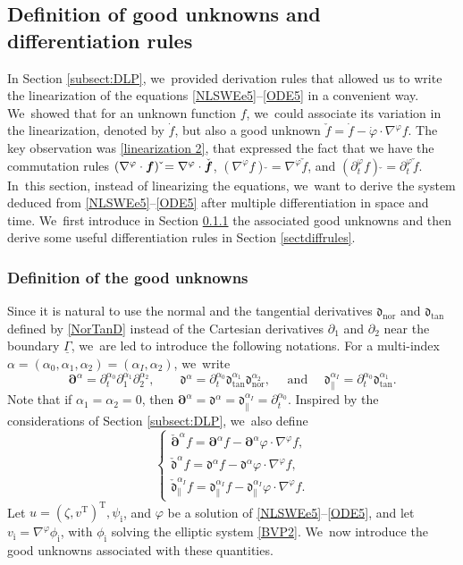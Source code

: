 \documentclass[10pt]{amsart}
\newcommand{\dtan}{{\mathfrak d}_\mathrm{tan}}
\newcommand{\dnor}{{\mathfrak d}_\mathrm{nor}}
\newcommand{\dpar}{{\mathfrak d}_{\parallel}}
\newcommand{\dt}{\partial_t}
\newcommand{\ul}[1]{\underline{#1}}
\newcommand{\itGamma}{\mathit{\Gamma}}
\newcommand{\cpalpha}{\check{\bm{\partial}}^{\alpha} }
\newcommand{\cmfalpha}{\check{\mathfrak{d}}^{\alpha}}
\newcommand{\cmfpalphaI}{\check{\mathfrak{d}}_{\parallel}^{\alpha_I}}
\theoremstyle{definition}
\begin{document}
\subsection{Definition of good unknowns and differentiation rules}\label{subsect:defGU}
In Section \ref{subsect:DLP}, we~provided derivation rules that allowed us to write the linearization of the equations \eqref{NLSWEe5}--\eqref{ODE5} in a convenient way. We~showed that for an unknown function $f$, we~could associate its variation in the linearization, denoted by $\dot{f}$, but also a good unknown $\check{f}=\dot{f}-\dot{\varphi}\cdot\nabla^\varphi f$.
The key observation was \eqref{linearization 2}, that expressed the fact that we have the commutation rules
$(\nabla^\varphi\cdot \mbox{\boldmath$f$})\,\check{} = \nabla^\varphi\cdot \check{\mbox{\boldmath$f$}}$, $(\nabla^\varphi f)\,\check{}
= \nabla^\varphi \check{f}$, and $(\dt^\varphi f)\,\check{} = \dt^\varphi \check{f}$. In~this section, instead of linearizing the equations, we~want to derive the system deduced from \eqref{NLSWEe5}--\eqref{ODE5} after multiple differentiation in space and time. We~first introduce in Section \ref{sectdefGU} the associated good unknowns and then derive some useful differentiation rules in Section \ref{sectdiffrules}.

\subsubsection{Definition of the good unknowns}\label{sectdefGU}
Since it is natural to use the normal and the tangential derivatives $\dnor$ and $\dtan$ defined by \eqref{NorTanD}
instead of the Cartesian derivatives $\partial_1$ and $\partial_2$ near the boundary $\ul{\itGamma}$, we~are led to introduce the following notations.
For a multi-index $\alpha=(\alpha_0,\alpha_1,\alpha_2)=(\alpha_I,\alpha_2)$, we~write
\[
\bm{\partial}^\alpha=\dt^{\alpha_0}\partial_1^{\alpha_1}\partial_2^{\alpha_2}, \qquad
\mathfrak{d}^\alpha=\dt^{\alpha_0}\dtan^{\alpha_1}\dnor^{\alpha_2},
\quad\mbox{ and } \quad
\dpar^{\alpha_I}=\dt^{\alpha_0}\dtan^{\alpha_1}.
\]
Note that if $\alpha_1=\alpha_2=0$, then $\bm{\partial}^\alpha=\mathfrak{d}^\alpha=\dpar^{\alpha_I}=\dt^{\alpha_0}$.
Inspired by the considerations of Section \ref{subsect:DLP}, we~also define
\[
\begin{cases}
\cpalpha f = \bm{\partial}^\alpha f -\bm{\partial}^\alpha\varphi\cdot \nabla^\varphi f, \\
\cmfalpha f=\mathfrak{d}^\alpha f -\mathfrak{d}^\alpha\varphi\cdot \nabla^\varphi f, \\
\cmfpalphaI f=\dpar^{\alpha_I} f -\dpar^{\alpha_I}\varphi\cdot \nabla^\varphi f.
\end{cases}
\]
Let $u=(\zeta,v^\mathrm{T})^\mathrm{T},\psi_\mathrm{i}$, and $\varphi$ be a solution of \eqref{NLSWEe5}--\eqref{ODE5},
and let $v_\mathrm{i}=\nabla^\varphi\phi_\mathrm{i}$, with $\phi_\mathrm{i}$ solving the elliptic system \eqref{BVP2}. We~now introduce the good unknowns associated with these quantities.
\end{document}
